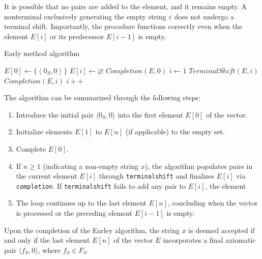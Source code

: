 It is possible that no pairs are added to the element, and it remains empty. 
A nonterminal exclusively generating the empty string $\varepsilon$ does not undergo a terminal shift.
Importantly, the procedure functions correctly even when the element $E[i]$ or its predecessor $E[i-1]$ is empty.
\begin{algorithm}[H]
  \caption{Early method algorithm}
      \begin{algorithmic}[1]
          \State $E[0] \leftarrow \{\left\langle 0_S,0 \right\rangle \}$
              \State $E[i] \leftarrow \varnothing$
          \EndFor
          \State $Completion(E,0)$
          \State $i \leftarrow 1$
              \State $TerminalShift(E,i)$
              \State $Completion(E,i)$
              \State $i++$
          \EndWhile 
      \end{algorithmic}
\end{algorithm}

The algorithm can be summarized through the following steps:
\begin{enumerate}
    \item Introduce the initial pair $\langle 0_S, 0 \rangle$ into the first element $E[0]$ of the vector.
    \item Initialize elements $E[1]$ to $E[n]$ (if applicable) to the empty set.
    \item Complete $E[0]$.
    \item If $n \geq 1$ (indicating a non-empty string $x$), the algorithm populates pairs in the current element $E[i]$ through \texttt{terminalshift} and finalizes $E[i]$ via \texttt{completion}. 
        If \texttt{terminalshift} fails to add any pair to $E[i]$, the element 
    \item The loop continues up to the last element $E[n]$, concluding when the vector is processed or the preceding element $E[i-1]$ is empty.
\end{enumerate}
\begin{property}
    Upon the completion of the Earley algorithm, the string $x$ is deemed accepted if and only if the last element $E[n]$ of the vector $E$ incorporates a final axiomatic pair $\langle f_S, 0 \rangle$, where $f_S \in F_S$.
\end{property}

